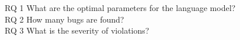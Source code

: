 \documentclass[
    numbers=noenddot,
    parskip=half-,
    fontsize=12pt,
    paper=a4,
    oneside,
    titlepage,
    bibliography=totoc,
    chapterprefix=false,
]{scrbook}
\begin{document}
    \begin{description}
        \item[RQ 1 What are the optimal parameters for the language model?] 
        \item[RQ 2 How many bugs are found?]
        \item[RQ 3 What is the severity of violations?]
    \end{description}


    \backmatter

    \printbibliography
\end{document}
